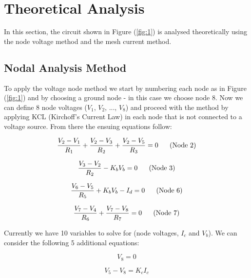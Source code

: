 \section{Theoretical Analysis}
\label{sec:analysis}

In this section, the circuit shown in Figure (\ref{fig:1}) is analysed
theoretically using the node voltage method and the mesh current method.


\subsection{Nodal Analysis Method}

To apply the voltage node method we start by numbering each node as in Figure (\ref{fig:1}) and by choosing a ground node - in this case we choose node 8.
Now we can define 8 node voltages ($V_1$, $V_2$, ..., $V_8$) and proceed with the method by applying KCL (Kirchoff's Current Law)
in each node that is not connected to a voltage source. From there the ensuing equations follow:

\begin{equation}
  \frac{V_2 - V_1}{R_1} + \frac{V_2 - V_3}{R_2} + \frac{V_2 - V_5}{R_3} = 0
  \;\;\;\;\;\;(\textnormal{Node 2})
  \label{eq:kvl}
\end{equation}

\begin{equation}
  \frac{V_3 - V_2}{R_2} - K_b V_b = 0
  \;\;\;\;\;\;(\textnormal{Node 3})
  \label{eq:kvl}
\end{equation}

\begin{equation}
  \frac{V_6 - V_5}{R_5} + K_b V_b - I_d = 0
  \;\;\;\;\;\;(\textnormal{Node 6})
  \label{eq:kvl}
\end{equation}

\begin{equation}
  \frac{V_7 - V_4}{R_6} + \frac{V_7 - V_8}{R_7} = 0
  \;\;\;\;\;\;(\textnormal{Node 7})
  \label{eq:kvl}
\end{equation}

Currently we have 10 variables to solve for (node voltages, $I_c$ and $V_b$). We can consider the following 5 additional equations:

\begin{equation}
    V_8 = 0
\end{equation}

\begin{equation}
    V_5 - V_8 = K_c I_c
\end{equation}

